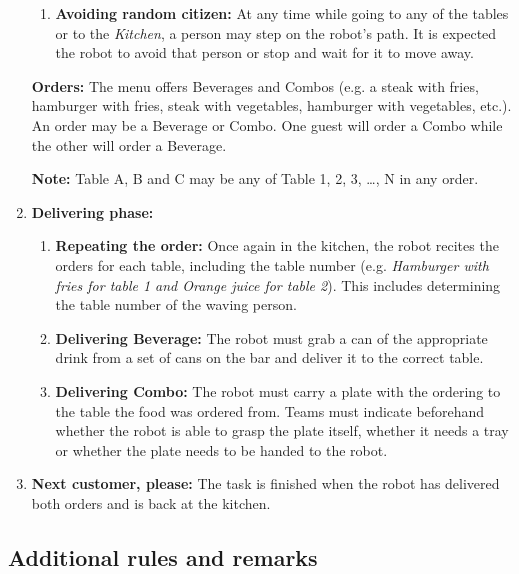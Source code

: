 \begin{enumerate}
\begin{enumerate}
\item \textbf{Avoiding random citizen:} At any time while going to any of the tables or to the \textit{Kitchen}, a person may step on the robot's path. It is expected the robot to avoid that person or stop and wait for it to move away.
\end{enumerate}

\textbf{Orders:} The menu offers Beverages and Combos (e.g. a steak with fries, hamburger with fries, steak with vegetables, hamburger with vegetables, etc.). An order may be a Beverage or Combo. One guest will order a Combo while the other will order a Beverage.

\textbf{Note:} Table A, B and C may be any of Table 1, 2, 3, \dots, N in any order.

\item \textbf{Delivering phase:}
\begin{enumerate}
\item \textbf{Repeating the order:} Once again in the kitchen, the robot recites the orders for each table, including the table number (e.g. \textit{Hamburger with fries for table 1 and Orange juice for table 2}). This includes determining the table number of the waving person.

\item \textbf{Delivering Beverage:} The robot must grab a can of the appropriate drink from a set of cans on the bar and deliver it to the correct table.

\item \textbf{Delivering Combo:}  The robot must carry a plate with the ordering to the table the food was ordered from. Teams must indicate beforehand whether the robot is able to grasp the plate itself, whether it needs a tray or whether the plate needs to be handed to the robot.
\end{enumerate}

\item \textbf{Next customer, please:} The task is finished when the robot has delivered both orders and is back at the kitchen.
\end{enumerate}

\subsection{Additional rules and remarks}

